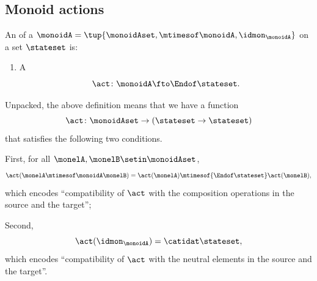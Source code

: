     

\subsection{Monoid actions}

\begin{ctdefinition}
    \label{def:monoid-cov-action}
    An  of a  $\monoidA = \tup{\monoidAset, \mtimesof\monoidA, \idmon_\monoidA}$ on a set $\stateset$ is:

    \constit
    \begin{enumerate}
        \item A 
              \begin{equation}
                  \label{eq:act-monoid}
                  \act \colon \monoidA \fto \Endof\stateset.
              \end{equation}
    \end{enumerate}
\end{ctdefinition}

Unpacked, the above definition means that we have a function
\begin{equation}
     \act \colon  \monoidAset \to (\stateset \to \stateset)
\end{equation}
that satisfies the following two conditions.
 
First, for all $\monelA, \monelB \setin \monoidAset$,
\begin{equation}
    \label{eq:act-to-endo-comp-compatibility}
    \act(\monelA \mtimesof\monoidA \monelB) = \act(\monelA) \mtimesof{\Endof\stateset} \act(\monelB), 
\end{equation}
which encodes ``compatibility of $\act$ with the composition operations in the source and the target'';

Second, 
\begin{equation}\label{eq:act-neutral-element-condit}
    \act(\idmon_\monoidA) = \catidat\stateset,
\end{equation}
which encodes ``compatibility of $\act$ with the neutral elements in the source and the target''. 

